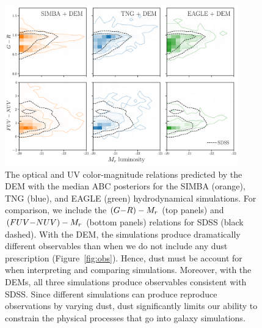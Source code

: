\begin{figure}
\begin{center}
    \includegraphics[width=0.9\textwidth]{figs/abc_observables.pdf}
    \caption{\label{fig:dem}
    The optical and UV color-magnitude relations predicted by the DEM with 
    the median ABC posteriors for the SIMBA (orange), TNG (blue), and EAGLE
    (green) hydrodynamical simulations. For comparison, we include the 
    $(G{-}R) - M_r$ (top panels) and $(FUV{-}NUV) - M_r$ (bottom panels) relations
    for SDSS (black dashed). With the DEM, the simulations produce dramatically 
    different observables than when we do not include any dust prescription
    (Figure~\ref{fig:obs}). Hence, dust must be account for when interpreting 
    and comparing simulations. Moreover, with the DEMs, all three simulations
    produce observables consistent with SDSS. Since different simulations can 
    produce reproduce observations by varying dust, dust significantly limits
    our ability to constrain the physical processes that go into galaxy
    simulations. 
    }
\end{center}
\end{figure}




